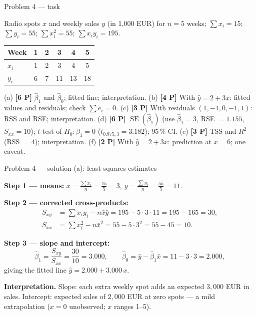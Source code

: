 \documentclass[aspectratio=169,11pt]{beamer}
\begin{document}
\begin{frame}{Problem 4 --- task}
  \begin{exercise}
    Radio spots $x$ and weekly sales $y$ (in 1{,}000 EUR) for $n=5$ weeks;
    $\sum x_i=15$; $\sum y_i=55$; $\sum x_i^2=55$; $\sum x_iy_i=195$.
    \begin{center}\scriptsize
    \begin{tabular}{lccccc}
      \toprule
      Week & 1 & 2 & 3 & 4 & 5\\
      \midrule
      $x_i$ & 1 & 2 & 3 & 4 & 5\\
      $y_i$ & 6 & 7 & 11 & 13 & 18\\
      \bottomrule
    \end{tabular}
    \end{center}
    (a) \textbf{[6 P]} $\hat\beta_1$ and $\hat\beta_0$; fitted line; interpretation.
    (b) \textbf{[4 P]} With $\hat y=2+3x$: fitted values and residuals; check $\sum e_i=0$.
    (c) \textbf{[3 P]} With residuals $(1,-1,0,-1,1)$: RSS and RSE; interpretation.
    (d) \textbf{[6 P]} $\operatorname{SE}(\hat\beta_1)$ (use $\hat\beta_1=3$, RSE $=1.155$, $S_{xx}=10$);
        $t$-test of $H_0\colon\beta_1=0$ ($t_{0.975{{,}}3}=3.182$); 95\,\% CI.
    (e) \textbf{[3 P]} TSS and $R^2$ (RSS $=4$); interpretation. \quad
    (f) \textbf{[2 P]} With $\hat y=2+3x$: prediction at $x=6$; one caveat.
  \end{exercise}
\end{frame}

\begin{frame}{Problem 4 --- solution (a): least-squares estimates}
  \begin{solutionbox}
    \textbf{Step 1 --- means:}\quad
    $\bar x=\tfrac{\sum x_i}{n}=\tfrac{15}{5}=3$,\qquad
    $\bar y=\tfrac{\sum y_i}{n}=\tfrac{55}{5}=11$.

    \textbf{Step 2 --- corrected cross-products:}
    \begin{align*}
      S_{xy}&=\sum x_iy_i-n\bar x\bar y=195-5\cdot 3\cdot 11=195-165=30,\\
      S_{xx}&=\sum x_i^2-n\bar x^2=55-5\cdot 3^2=55-45=10.
    \end{align*}

    \textbf{Step 3 --- slope and intercept:}
    \[
      \hat\beta_1=\frac{S_{xy}}{S_{xx}}=\frac{30}{10}=3.000,\qquad
      \hat\beta_0=\bar y-\hat\beta_1\bar x=11-3\cdot 3=2.000,
    \]
    giving the fitted line $\hat y=2.000+3.000\,x$.

    \textbf{Interpretation.} Slope: each extra weekly spot adds an expected $3{,}000$ EUR in
    sales. Intercept: expected sales of $2{,}000$ EUR at zero spots --- a mild extrapolation
    ($x=0$ unobserved; $x$ ranges 1--5).
  \end{solutionbox}
\end{frame}
\end{document}
